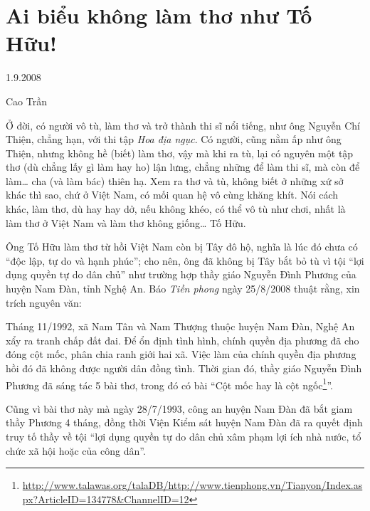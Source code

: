 \documentclass[../main.tex]{subfiles}
\begin{document}
\chapter{Ai biểu không làm thơ như Tố Hữu!}

\begin{metadata}

\begin{flushright}1.9.2008\end{flushright}

Cao Trần



\end{metadata}

\begin{multicols}{2}

Ở đời, có người vô tù, làm thơ và trở thành thi sĩ nổi tiếng, như ông Nguyễn Chí Thiện, chẳng hạn, với thi tập \textit{Hoa địa ngục}. Có người, cũng nằm ấp như ông Thiện, nhưng không hề (biết) làm thơ, vậy mà khi ra tù, lại có nguyên một tập thơ (dù chẳng lấy gì làm hay ho) lận lưng, chẳng những để làm thi sĩ, mà còn để làm… cha (và làm bác) thiên hạ. Xem ra thơ và tù, không biết ở những xứ sở khác thì sao, chứ ở Việt Nam, có mối quan hệ vô cùng khăng khít. Nói cách khác, làm thơ, dù hay hay dở, nếu không khéo, có thể vô tù như chơi, nhất là làm thơ ở Việt Nam và làm thơ không giống… Tố Hữu. 
 
Ông Tố Hữu làm thơ từ hồi Việt Nam còn bị Tây đô hộ, nghĩa là lúc đó chưa có “độc lập, tự do và hạnh phúc”; cho nên, ông đã không bị Tây bắt bỏ tù vì tội “lợi dụng quyền tự do dân chủ” như trường hợp thầy giáo Nguyễn Đình Phương của huyện Nam Đàn, tỉnh Nghệ An. Báo \textit{Tiền phong} ngày 25/8/2008 thuật rằng, xin trích nguyên văn: 
\begin{blockquote}
 
Tháng 11/1992, xã Nam Tân và Nam Thượng thuộc huyện Nam Đàn, Nghệ An xẩy ra tranh chấp đất đai. Để ổn định tình hình, chính quyền địa phương đã cho đóng cột mốc, phân chia ranh giới hai xã. Việc làm của chính quyền địa phương hồi đó đã không được người dân đồng tình. Thời gian đó, thầy giáo Nguyễn Đình Phương đã sáng tác 5 bài thơ, trong đó có bài “Cột mốc hay là cột ngốc\footnote{\url{http://www.talawas.org/talaDB/http://www.tienphong.vn/Tianyon/Index.aspx?ArticleID=134778&ChannelID=12}}”. 

\end{blockquote}
 
Cũng vì bài thơ này mà ngày 28/7/1993, công an huyện Nam Đàn đã bắt giam thầy Phương 4 tháng, đồng thời Viện Kiểm sát huyện Nam Đàn đã ra quyết định truy tố thầy về tội “lợi dụng quyền tự do dân chủ xâm phạm lợi ích nhà nước, tổ chức xã hội hoặc của công dân”. 
 

\end{multicols}
\end{document}
